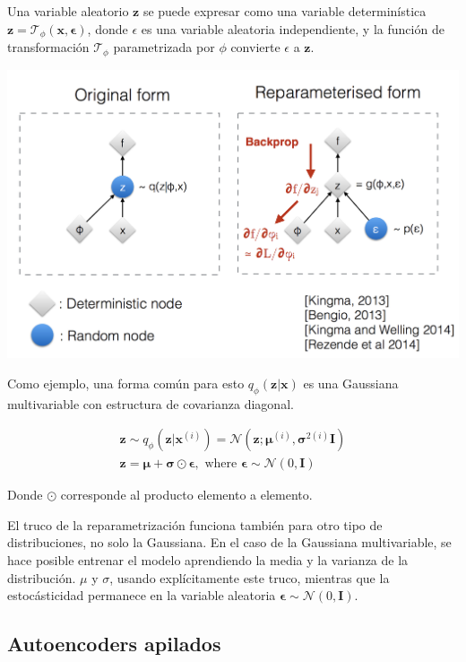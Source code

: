 \documentclass[
  12pt,
  a4paperpaper,
]{report}
\begin{document}
Una variable aleatorio \(\mathbf{z}\) se puede expresar como una
variable determinística
\(\mathbf{z}=\mathcal{T}_{\phi}(\mathbf{x}, \boldsymbol{\epsilon})\),
donde \(\epsilon\) es una variable aleatoria independiente, y la función
de transformación \(\mathcal{T}_{\phi}\) parametrizada por \(\phi\)
convierte \(\epsilon\) a \(\mathbf{z}\).

\includegraphics{source/figures/reparameterization-trick.png}

Como ejemplo, una forma común para esto
\(q_{\phi}(\mathbf{z} | \mathbf{x})\) es una Gaussiana multivariable con
estructura de covarianza diagonal.

\[
\begin{array}{l}
\mathbf{z} \sim q_{\phi}\left(\mathbf{z} | \mathbf{x}^{(i)}\right)=\mathcal{N}\left(\mathbf{z} ; \boldsymbol{\mu}^{(i)}, \boldsymbol{\sigma}^{2(i)} \boldsymbol{I}\right) \\
\mathbf{z}=\boldsymbol{\mu}+\boldsymbol{\sigma} \odot \boldsymbol{\epsilon}, \text { where } \boldsymbol{\epsilon} \sim \mathcal{N}(0, \boldsymbol{I})
\end{array}
\]

Donde \(\odot\) corresponde al producto elemento a elemento.

El truco de la reparametrización funciona también para otro tipo de
distribuciones, no solo la Gaussiana. En el caso de la Gaussiana
multivariable, se hace posible entrenar el modelo aprendiendo la media y
la varianza de la distribución. \(\mu\) y \(\sigma\), usando
explícitamente este truco, mientras que la estocásticidad permanece en
la variable aleatoria
\(\boldsymbol{\epsilon} \sim \mathcal{N}(0, \boldsymbol{I})\).

\hypertarget{autoencoders-apilados}{%
\subsection{Autoencoders apilados}\label{autoencoders-apilados}}
\end{document}
